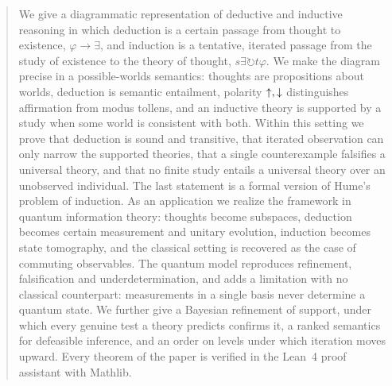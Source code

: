\begin{abstract}
We give a diagrammatic representation of deductive and inductive reasoning in which deduction is a
certain passage from thought to existence, $\varphi \to \exists$, and induction is a tentative,
iterated passage from the study of existence to the theory of thought, $s\exists \circlearrowright
t\varphi$. We make the diagram precise in a possible-worlds semantics: thoughts are propositions
about worlds, deduction is semantic entailment, polarity $\up,\down$ distinguishes affirmation from
modus tollens, and an inductive theory is supported by a study when some world is consistent with
both. Within this setting we prove that deduction is sound and transitive, that iterated
observation can only narrow the supported theories, that a single counterexample falsifies a
universal theory, and that no finite study entails a universal theory over an unobserved
individual. The last statement is a formal version of Hume's problem of induction. As an
application we realize the framework in quantum information theory: thoughts become subspaces,
deduction becomes certain measurement and unitary evolution, induction becomes state tomography,
and the classical setting is recovered as the case of commuting observables. The quantum model
reproduces refinement, falsification and underdetermination, and adds a limitation with no
classical counterpart: measurements in a single basis never determine a quantum state. We
further give a Bayesian refinement of support, under which every genuine test a theory predicts
confirms it, a ranked semantics for defeasible inference, and an order on levels under which
iteration moves upward. Every theorem of the paper is verified in the Lean~4 proof assistant with
Mathlib.
\end{abstract}
